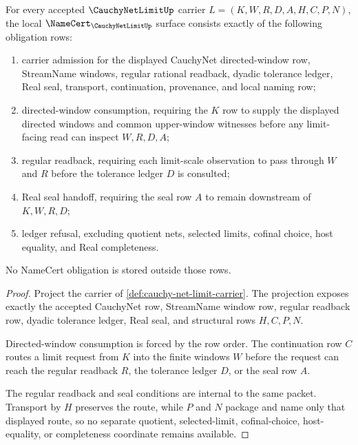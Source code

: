\begin{theorem}
\label{thm:cauchy-net-limit-namecert-obligations}
For every accepted $\CauchyNetLimitUp$ carrier $L=(K,W,R,D,A,H,C,P,N)$, the local $\NameCert_{\CauchyNetLimitUp}$ surface consists exactly of the following obligation rows:
\begin{enumerate}
\item carrier admission for the displayed CauchyNet directed-window row, StreamName windows, regular rational readback, dyadic tolerance ledger, Real seal, transport, continuation, provenance, and local naming row;
\item directed-window consumption, requiring the $K$ row to supply the displayed directed windows and common upper-window witnesses before any limit-facing read can inspect $W,R,D,A$;
\item regular readback, requiring each limit-scale observation to pass through $W$ and $R$ before the tolerance ledger $D$ is consulted;
\item Real seal handoff, requiring the seal row $A$ to remain downstream of $K,W,R,D$;
\item ledger refusal, excluding quotient nets, selected limits, cofinal choice, host equality, and Real completeness.
\end{enumerate}
No NameCert obligation is stored outside those rows.
\end{theorem}
\begin{proof}
Project the carrier of \autoref{def:cauchy-net-limit-carrier}. The projection exposes exactly the accepted CauchyNet row, StreamName window row, regular readback row, dyadic tolerance ledger, Real seal, and structural rows $H,C,P,N$.

Directed-window consumption is forced by the row order. The continuation row $C$ routes a limit request from $K$ into the finite windows $W$ before the request can reach the regular readback $R$, the tolerance ledger $D$, or the seal row $A$.

The regular readback and seal conditions are internal to the same packet. Transport by $H$ preserves the route, while $P$ and $N$ package and name only that displayed route, so no separate quotient, selected-limit, cofinal-choice, host-equality, or completeness coordinate remains available.
\end{proof}

